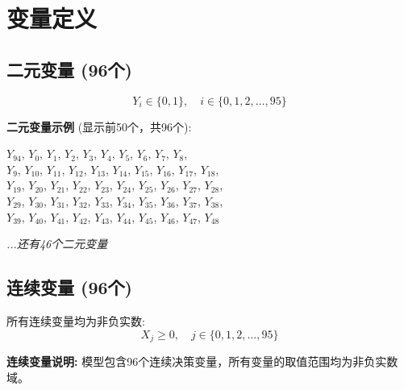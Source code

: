 \documentclass[a4paper,10pt]{article}
\begin{document}
\section{变量定义}

\subsection{二元变量 (96个)}

\begin{equation}
Y_i \in \{0,1\}, \quad i \in \{0, 1, 2, \ldots, 95\}
\end{equation}

\textbf{二元变量示例} (显示前50个，共96个):

{\small
$Y_{94}$, $Y_{0}$, $Y_{1}$, $Y_{2}$, $Y_{3}$, $Y_{4}$, $Y_{5}$, $Y_{6}$, $Y_{7}$, $Y_{8}$, \\
$Y_{9}$, $Y_{10}$, $Y_{11}$, $Y_{12}$, $Y_{13}$, $Y_{14}$, $Y_{15}$, $Y_{16}$, $Y_{17}$, $Y_{18}$, \\
$Y_{19}$, $Y_{20}$, $Y_{21}$, $Y_{22}$, $Y_{23}$, $Y_{24}$, $Y_{25}$, $Y_{26}$, $Y_{27}$, $Y_{28}$, \\
$Y_{29}$, $Y_{30}$, $Y_{31}$, $Y_{32}$, $Y_{33}$, $Y_{34}$, $Y_{35}$, $Y_{36}$, $Y_{37}$, $Y_{38}$, \\
$Y_{39}$, $Y_{40}$, $Y_{41}$, $Y_{42}$, $Y_{43}$, $Y_{44}$, $Y_{45}$, $Y_{46}$, $Y_{47}$, $Y_{48}$

\textit{...还有46个二元变量}
}

\subsection{连续变量 (96个)}

所有连续变量均为非负实数:
\begin{equation}
X_j \geq 0, \quad j \in \{0, 1, 2, \ldots, 95\}
\end{equation}

\textbf{连续变量说明:} 模型包含96个连续决策变量，所有变量的取值范围均为非负实数域。
\end{document}
